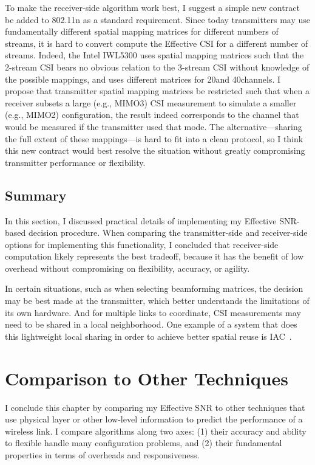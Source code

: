 To make the receiver-side algorithm work best, I suggest a simple new contract be added to 802.11n as a standard requirement. Since today transmitters may use fundamentally different spatial mapping matrices for different numbers of streams, it is hard to convert compute the Effective CSI for a different number of streams. Indeed, the Intel IWL5300 uses spatial mapping matrices such that the 2-stream CSI bears no obvious relation to the 3-stream CSI without knowledge of the possible mappings, and uses different matrices for 20\MHz and 40\MHz channels.  I propose that transmitter spatial mapping matrices be restricted such that when a receiver subsets a large (e.g., MIMO3) CSI measurement to simulate a smaller (e.g., MIMO2) configuration, the result indeed corresponds to the channel that would be measured if the transmitter used that mode. The alternative---sharing the full extent of these mappings---is hard to fit into a clean protocol, so I think this new contract would best resolve the situation without greatly compromising transmitter performance or flexibility.

\subsection{Summary}
In this section, I discussed practical details of implementing my Effective SNR-based decision procedure. When comparing the transmitter-side and receiver-side options for implementing this functionality, I concluded that receiver-side computation likely represents the best tradeoff, because it has the benefit of low overhead without compromising on flexibility, accuracy, or agility.

In certain situations, such as when selecting beamforming matrices, the decision may be best made at the transmitter, which better understands the limitations of its own hardware. And for multiple links to coordinate, CSI measurements may need to be shared in a local neighborhood. One example of a system that does this lightweight local sharing in order to achieve better spatial reuse is IAC~\cite{Gollakota_IAC}.

\section{Comparison to Other Techniques}
I conclude this chapter by comparing my Effective SNR to other techniques that use physical layer or other low-level information to predict the performance of a wireless link. I compare algorithms along two axes: (1) their accuracy and ability to flexible handle many configuration problems, and (2) their fundamental properties in terms of overheads and responsiveness.

